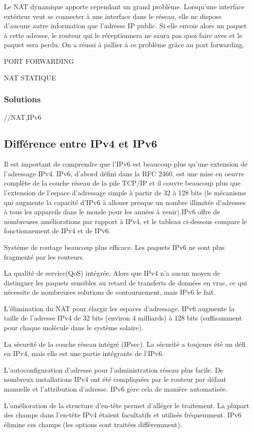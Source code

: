 Le NAT dynamique apporte cependant un grand problème. Lorsqu'une interface
extérieur veut se connecter à une interface dans le réseau, elle ne dispose
d'aucune autre information que l'adresse IP public. Si elle envoie alors un
paquet à cette adresse, le routeur qui le réceptionnera ne saura pas quoi faire
avec et le paquet sera perdu.  On a réussi à pallier à ce problème grâce au
port forwarding. 

PORT FORWARDING

NAT STATIQUE


\subsubsection{Solutions}
//NAT,IPv6
\subsection{Différence entre IPv4 et IPv6}


Il est important de comprendre que l'IPv6 est beaucoup plus qu'une extension de
l'adressage IPv4. IPv6, d'abord défini dans la RFC 2460, est une mise en oeuvre
complète de la couche réseau de la pile TCP/IP et il couvre beaucoup plus que
l'extension de l'espace d'adressage simple à partir de 32 à 128 bits (le
mécanisme qui augmente la capacité d'IPv6 à allouer presque un nombre illimitée
d'adresses à tous les appareils dans le monde pour les années à venir).IPv6
offre de nombreuses améliorations par rapport à IPv4, et le tableau ci-dessous
compare le fonctionnement de IPv4 et de IPv6.

Systéme de routage beaucoup plus efficace. Les paquets IPv6 ne sont plus
fragmenté par les routeurs.
	
La qualité de service(QoS) intégrée. Alors que IPv4 n'a aucun moyen de
distinguer les paquets sensibles au retard de transferts de données en vrac, ce
qui nécessite de nombreuses solutions de contournement, mais IPv6 le fait.
	
L'élimination du NAT pour élargir les espaces d'adressage. IPv6 augmente la
taille de l'adresse IPv4 de 32 bits (environ 4 milliards) à 128 bits
(suffisamment pour chaque molécule dans le système solaire).
	
La sécurité de la couche réseau intégré (IPsec). La sécurité a toujours été
un défi en IPv4, mais elle est une partie intégrante de l'IPv6.
	
L'autoconfiguration d'adresse pour l'administration réseau plus facile. De
nombreux installations IPv4 ont été compliquées par le routeur par défaut
manuelle et l'attribution d'adresse. IPv6 gère cela de manière automatisée.
	
L'amélioration de la structure d'en-tête permet d'alléger le traitement. La
plupart des champs dans l'en-tête IPv4 étaient facultatifs et utilisés
fréquemment. IPv6 élimine ces champs (les options sont traitées différemment).
